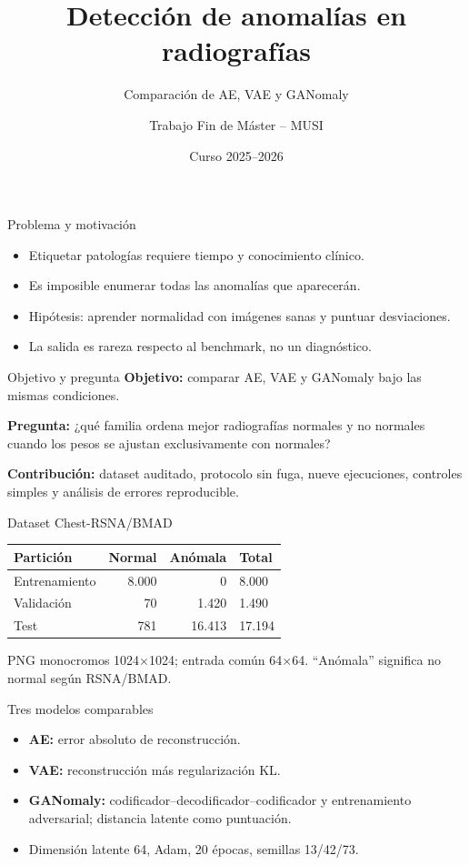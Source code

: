 \documentclass[aspectratio=169,10pt]{beamer}
\title{Detección de anomalías en radiografías}
\subtitle{Comparación de AE, VAE y GANomaly}
\author{Trabajo Fin de Máster -- MUSI}
\date{Curso 2025--2026}
\begin{document}
\begin{frame}
  \titlepage
\end{frame}

\begin{frame}{Problema y motivación}
  \begin{itemize}
    \item Etiquetar patologías requiere tiempo y conocimiento clínico.
    \item Es imposible enumerar todas las anomalías que aparecerán.
    \item Hipótesis: aprender normalidad con imágenes sanas y puntuar desviaciones.
    \item La salida es rareza respecto al benchmark, no un diagnóstico.
  \end{itemize}
\end{frame}

\begin{frame}{Objetivo y pregunta}
  \textbf{Objetivo:} comparar AE, VAE y GANomaly bajo las mismas condiciones.
  \vspace{0.8em}

  \textbf{Pregunta:} ¿qué familia ordena mejor radiografías normales y no
  normales cuando los pesos se ajustan exclusivamente con normales?
  \vspace{0.8em}

  \textbf{Contribución:} dataset auditado, protocolo sin fuga, nueve
  ejecuciones, controles simples y análisis de errores reproducible.
\end{frame}

\begin{frame}{Dataset Chest-RSNA/BMAD}
  \begin{center}
  \begin{tabular}{lrr}
    \toprule
    Partición & Normal & Anómala & Total \\
    \midrule
    Entrenamiento & 8.000 & 0 & 8.000 \\
    Validación & 70 & 1.420 & 1.490 \\
    Test & 781 & 16.413 & 17.194 \\
    \bottomrule
  \end{tabular}
  \end{center}
  PNG monocromos 1024$\times$1024; entrada común 64$\times$64. ``Anómala''
  significa no normal según RSNA/BMAD.
\end{frame}

\begin{frame}{Tres modelos comparables}
  \begin{itemize}
    \item \textbf{AE:} error absoluto de reconstrucción.
    \item \textbf{VAE:} reconstrucción más regularización KL.
    \item \textbf{GANomaly:} codificador--decodificador--codificador y
      entrenamiento adversarial; distancia latente como puntuación.
    \item Dimensión latente 64, Adam, 20 épocas, semillas 13/42/73.
  \end{itemize}
\end{frame}
\end{document}
